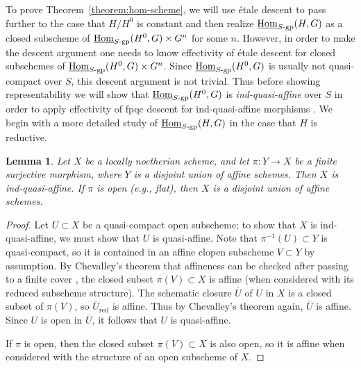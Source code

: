 \documentclass[11pt, letterpaper,english]{amsart}
\theoremstyle{plain}
\newtheorem{lemma}[lem]{Lemma}
\theoremstyle{definition}
\numberwithin{equation}{section}
\numberwithin{lem}{section}
\DeclareMathOperator{\Hom}{Hom}
\begin{document}
To prove Theorem~\ref{theorem:hom-scheme}, we will use \'{e}tale descent to pass further to the case that $H/H^0$ is constant and then realize $\underline{\Hom}_{S\textrm{-}\rm{gp}}(H, G)$ as a closed subscheme of $\underline{\Hom}_{S\textrm{-}\rm{gp}}(H^0, G) \times G^n$ for some $n$. However, in order to make the descent argument one needs to know effectivity of \'{e}tale descent for closed subschemes of $\underline{\Hom}_{S\textrm{-}\rm{gp}}(H^0, G) \times G^n$. Since $\underline{\Hom}_{S\textrm{-}\rm{gp}}(H^0, G)$ is usually not quasi-compact over $S$, this descent argument is not trivial. Thus before showing representability we will show that $\underline{\Hom}_{S\textrm{-}\rm{gp}}(H^0, G)$ is \textit{ind-quasi-affine} over $S$ \cite[\href{https://stacks.math.columbia.edu/tag/0AP6}{Tag 0AP6}]{stacks-project} in order to apply effectivity of fpqc descent for ind-quasi-affine morphisms \cite[\href{https://stacks.math.columbia.edu/tag/0APK}{Tag 0APK}]{stacks-project}. We begin with a more detailed study of $\underline{\Hom}_{S\textrm{-}\rm{gp}}(H, G)$ in the case that $H$ is reductive.

\begin{lemma}\label{lemma:ind-quasi-affine-criterion}
    Let $X$ be a locally noetherian scheme, and let $\pi: Y \to X$ be a finite surjective morphism, where $Y$ is a disjoint union of affine schemes. Then $X$ is ind-quasi-affine. If $\pi$ is open (e.g., flat), then $X$ is a disjoint union of affine schemes.
\end{lemma}

\begin{proof}
    Let $U \subset X$ be a quasi-compact open subscheme; to show that $X$ is ind-quasi-affine, we must show that $U$ is quasi-affine. Note that $\pi^{-1}(U) \subset Y$ is quasi-compact, so it is contained in an affine clopen subscheme $V \subset Y$ by assumption. By Chevalley's theorem that affineness can be checked after passing to a finite cover \cite[II, Th\'eor\`eme 6.7.1]{EGA}, the closed subset $\pi(V) \subset X$ is affine (when considered with its reduced subscheme structure). The schematic closure $\overline{U}$ of $U$ in $X$ is a closed subset of $\pi(V)$, so $\overline{U}_{\mathrm{red}}$ is affine. Thus by Chevalley's theorem again, $\overline{U}$ is affine. Since $U$ is open in $\overline{U}$, it follows that $U$ is quasi-affine.\smallskip

    If $\pi$ is open, then the closed subset $\pi(V) \subset X$ is also open, so it is affine when considered with the structure of an open subscheme of $X$.
\end{proof}
\end{document}
